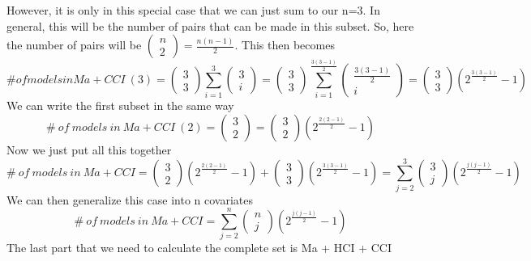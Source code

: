 However, it is only in this special case that we can just sum to our n=3. In general, this will be the number of pairs that can be made in this subset. So, here the number of pairs will be $\left( \begin{array}{c}
n \\ 
2 \end{array}
\right)=\frac{n\left(n-1\right)}{2}$. This then becomes
\[\#of models in Ma+CCI\ \left(3\right)=\left( \begin{array}{c}
3 \\ 
3 \end{array}
\right)\sum^3_{i=1}{\left( \begin{array}{c}
3 \\ 
i \end{array}
\right)}=\left( \begin{array}{c}
3 \\ 
3 \end{array}
\right)\sum^{\frac{3\left(3-1\right)}{2}}_{i=1}{\left( \begin{array}{c}
\frac{3\left(3-1\right)}{2} \\ 
i \end{array}
\right)}=\left( \begin{array}{c}
3 \\ 
3 \end{array}
\right)\left(2^{\frac{3\left(3-1\right)}{2}}-1\right)\] 
We can write the first subset in the same way
\[\#\ of\ models\ in\ Ma+CCI\ \left(2\right)=\left( \begin{array}{c}
3 \\ 
2 \end{array}
\right)=\left( \begin{array}{c}
3 \\ 
2 \end{array}
\right)\left(2^{\frac{2\left(2-1\right)}{2}}-1\right)\] 
Now we just put all this together
\[\#\ of\ models\ in\ Ma+CCI=\left( \begin{array}{c}
3 \\ 
2 \end{array}
\right)\left(2^{\frac{2\left(2-1\right)}{2}}-1\right)+\left( \begin{array}{c}
3 \\ 
3 \end{array}
\right)\left(2^{\frac{3\left(3-1\right)}{2}}-1\right)=\sum^3_{j=2}{\left( \begin{array}{c}
3 \\ 
j \end{array}
\right)\left(2^{\frac{j\left(j-1\right)}{2}}-1\right)}\] 
We can then generalize this case into n covariates
\[\#\ of\ models\ in\ Ma+CCI=\sum^n_{j=2}{\left( \begin{array}{c}
n \\ 
j \end{array}
\right)\left(2^{\frac{j\left(j-1\right)}{2}}-1\right)}\] 
The last part that we need to calculate the complete set is Ma + HCI + CCI

